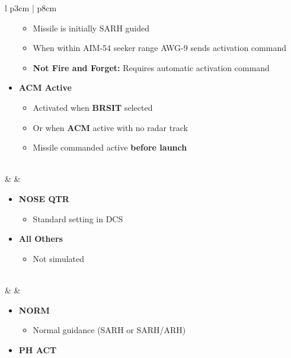 \documentclass[8pt,usenames,dvipsnames,twoside]{article}
\begin{document}
\begin{center}
\begin{longtable}{l p{3cm} | p{8cm}}
\begin{minipage}[t]{\linewidth}
\begin{itemize}
\begin{itemize}
							\item Missile is initially SARH guided
							\item When within AIM-54 seeker range AWG-9 sends activation command
							\item \textbf{Not Fire and Forget:} Requires automatic activation command
						\end{itemize}
						\item \textbf{ACM Active}
						\begin{itemize}
							\item Activated when \textbf{BRSIT} selected
							\item Or when \textbf{ACM} active with no radar track
							\item Missile commanded active \textbf{before launch}
						\end{itemize}
					\end{itemize}
				\end{minipage} \\
				\midrule
				\textbullet &   & 
				\begin{minipage}[t]{\linewidth}
					\vspace{-7pt}
					\begin{itemize}
						\item \textbf{NOSE QTR}
						\begin{itemize}
							\item Standard setting in DCS
						\end{itemize}
						\item \textbf{All Others}
						\begin{itemize}
							\item Not simulated
						\end{itemize}
					\end{itemize}
				\end{minipage} \\
				\midrule
				\textbullet &   & 
				\begin{minipage}[t]{\linewidth}
					\vspace{-7pt}
					\begin{itemize}
						\item \textbf{NORM}
						\begin{itemize}
							\item Normal guidance (SARH or SARH/ARH)
						\end{itemize}
						\item \textbf{PH ACT}
						\begin{itemize}

\end{itemize}
\end{itemize}
\end{minipage}
\end{longtable}
\end{center}
\end{document}

